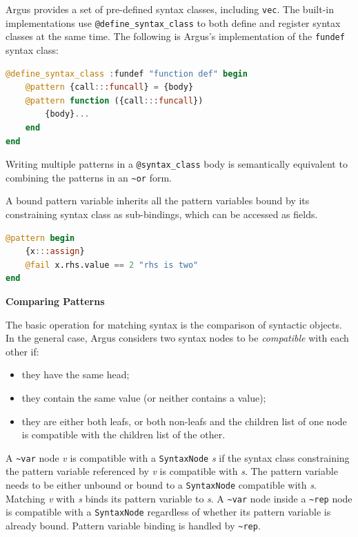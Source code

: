 \documentclass{juliacon}
\begin{document}
Argus provides a set of pre-defined syntax classes, including
\texttt{vec}. The built-in implementations use \texttt{@define\_syntax\_class} to both
define and register syntax classes at the same time. The following is
Argus's implementation of the \texttt{fundef} syntax class:

\begin{lstlisting}[language=julia]
@define_syntax_class :fundef "function def" begin
    @pattern {call:::funcall} = {body}
    @pattern function ({call:::funcall})
        {body}...
    end
end
\end{lstlisting}

Writing multiple patterns in a \texttt{@syntax\_class} body is semantically
equivalent to combining the patterns in an \texttt{\textasciitilde{}or} form.

A bound pattern variable inherits all the pattern variables bound by
its constraining syntax class as sub-bindings, which can be accessed
as fields.

\begin{lstlisting}[language=julia]
@pattern begin
    {x:::assign}
    @fail x.rhs.value == 2 "rhs is two"
end
\end{lstlisting}

\label{org718abd6}\vspace{0.2cm}
\textbf{Comparing Patterns}\vspace{0.2cm}

The basic operation for matching syntax is the comparison of syntactic
objects. In the general case, Argus considers two syntax nodes to be
\emph{compatible} with each other if:

\begin{itemize}
\item they have the same head;
\item they contain the same value (or neither contains a value);
\item they are either both leafs, or both non-leafs and the children list
of one node is compatible with the children list of the other.
\end{itemize}

A \texttt{\textasciitilde{}var} node \emph{v} is compatible with a \texttt{SyntaxNode} \emph{s} if the syntax
class constraining the pattern variable referenced by \emph{v} is
compatible with \emph{s}. The pattern variable needs to be either unbound
or bound to a \texttt{SyntaxNode} compatible with \emph{s}. Matching \emph{v} with \emph{s}
binds its pattern variable to \emph{s}. A \texttt{\textasciitilde{}var} node inside a \texttt{\textasciitilde{}rep} node
is compatible with a \texttt{SyntaxNode} regardless of whether its pattern
variable is already bound. Pattern variable binding is handled by
\texttt{\textasciitilde{}rep}.
\end{document}
